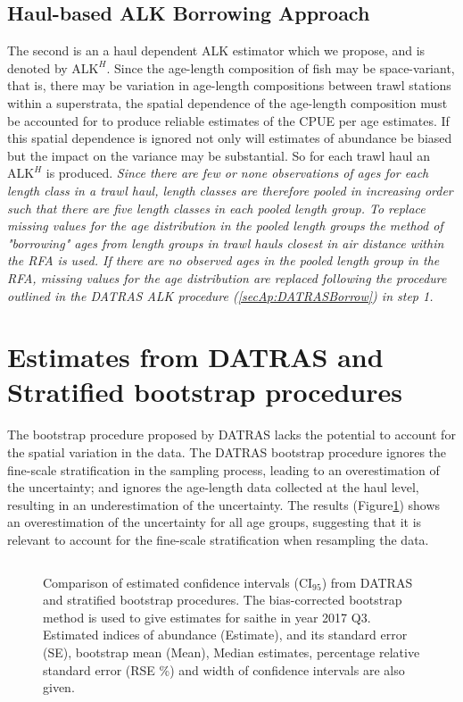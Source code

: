 \documentclass[a4paper 12pt]{article}
\numberwithin{equation}{section}
\begin{document}
\subsection{\normalsize Haul-based ALK Borrowing Approach}
\label{secAp:oursBorrow}
\indent  The second is an a haul dependent ALK estimator which we propose, and is denoted by $\mathrm{ALK}^{H}$. Since the age-length composition of fish may be space-variant, that is, there may be variation in age-length compositions between trawl stations within a superstrata, the spatial dependence of the age-length composition must be accounted for to produce reliable estimates of the CPUE per age estimates. If this spatial dependence is ignored not only will estimates of abundance be biased but the impact on the variance may be substantial. So for each trawl haul an $\mathrm{ALK}^{H}$ is produced. \emph{Since there are few or none observations of ages for each length class in a trawl haul, length classes are therefore pooled in increasing order such that there are five length classes in each pooled length group. To replace missing values for the age distribution in the pooled length groups the method of "borrowing" ages from length groups in trawl hauls closest in air distance within the RFA is used. If there are no observed ages in the pooled length group in the RFA, missing values for the age distribution are replaced following the procedure outlined in the DATRAS ALK procedure (\ref{secAp:DATRASBorrow}) in step 1.  }

\section{\large Estimates from DATRAS and Stratified bootstrap procedures}
\label{secAp:resultsdatrasALK}
The bootstrap procedure proposed by DATRAS lacks the potential to account for the spatial variation in the data. The DATRAS bootstrap procedure ignores the fine-scale stratification in the sampling process, leading to an overestimation of the uncertainty; and ignores the age-length data collected at the haul level, resulting in an underestimation of the uncertainty. The results (Figure\ref{DatrasStratified}) shows an overestimation of the uncertainty for all age groups, suggesting that it is relevant to account for the fine-scale stratification when resampling the data.


\begin{figure}[h!]
\centering
\begin{tabular}{@{}ccc@{}}
\end{tabular}
\caption[]{Comparison of estimated confidence intervals ($\mathrm{CI}_{95}$) from DATRAS and stratified bootstrap procedures. The bias-corrected bootstrap method is used to give estimates for saithe in year 2017 Q3. Estimated indices of abundance (Estimate), and its standard error (SE), bootstrap mean (Mean), Median estimates, percentage relative standard error (RSE \%) and width of confidence intervals  are also given.}
\label{DatrasStratified}
\end{figure} 




\end{document}
